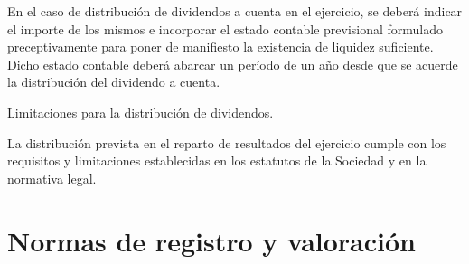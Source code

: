 \documentclass[11pt,a4paper]{article}
\begin{document}
En el caso de distribución de dividendos a cuenta en el ejercicio, se deberá indicar el importe de los mismos e incorporar el estado contable previsional formulado preceptivamente para poner de manifiesto la existencia de liquidez suficiente. Dicho estado contable deberá abarcar un período de un año desde que se acuerde la distribución del dividendo a cuenta.

Limitaciones para la distribución de dividendos.

La distribución prevista en el reparto de resultados del ejercicio cumple con los requisitos y limitaciones establecidas en los estatutos de la Sociedad y en la normativa legal.


\section{Normas de registro y valoración}
\end{document}
